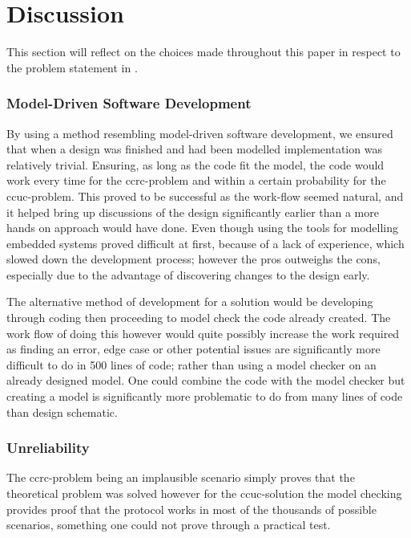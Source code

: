 \section{Discussion}\label{sec:discussion}
This section will reflect on the choices made throughout this paper in respect to the problem statement in .

\subsubsection{Model-Driven Software Development}
By using a method resembling model-driven software development, we ensured that when a design was finished and had been modelled implementation was relatively trivial.
Ensuring, as long as the code fit the model, the code would work every time for the \gls{ccrc}-problem and within a certain probability for the \gls{ccuc}-problem.
This proved to be successful as the work-flow seemed natural, and it helped bring up discussions of the design significantly earlier than a more hands on approach would have done.
Even though using the tools for modelling embedded systems proved difficult at first, because of a lack of experience, which slowed down the development process; however the pros outweighs the cons, especially due to the advantage of discovering changes to the design early.

The alternative method of development for a solution would be developing through coding then proceeding to model check the code already created.
The work flow of doing this however would quite possibly increase the work required as finding an error, edge case or other potential issues are significantly more difficult to do in 500 lines of code; rather than using a model checker on an already designed model.
One could combine the code with the model checker but creating a model is significantly more problematic to do from many lines of code than design schematic.

\newpage
\subsubsection{Unreliability}
The \gls{ccrc}-problem being an implausible scenario simply proves that the theoretical problem was solved however for the \gls{ccuc}-solution the model checking provides proof that the protocol works in most of the thousands of possible scenarios, something one could not prove through a practical test.


